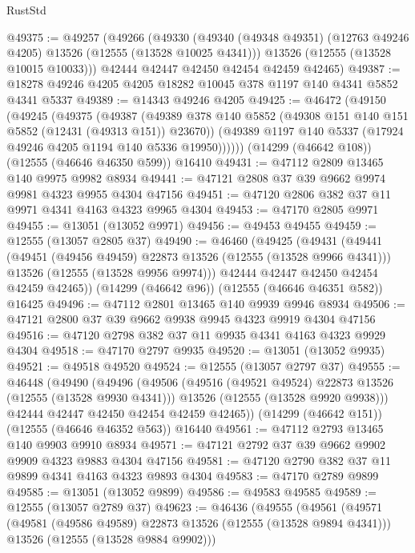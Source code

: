 \begin{lexlean}{RustStd}
\begin{coremodule}
@49375 := @49257
    (@49266
      (@49330
        (@49340 (@49348 @49351) (@12763 @49246 @4205) @13526 (@12555 (@13528 @10025 @4341)))
        @13526
        (@12555 (@13528 @10015 @10033)))
      @42444
      @42447
      @42450
      @42454
      @42459
      @42465)
@49387 := @18278 @49246 @4205 @4205 @18282 @10045 @378 @1197 @140 @4341 @5852 @4341 @5337
@49389 := @14343 @49246 @4205
@49425 := @46472
    (@49150
      (@49245
        (@49375
          (@49387
            (@49389 @378 @140 @5852 (@49308 @151 @140 @151 @5852 (@12431 (@49313 @151)) @23670))
            (@49389 @1197 @140 @5337 (@17924 @49246 @4205 @1194 @140 @5336 @19950))))))
    (@14299 (@46642 @108))
    (@12555 (@46646 @46350 @599))
    @16410
@49431 := @47112 @2809 @13465 @140 @9975 @9982 @8934
@49441 := @47121 @2808 @37 @39 @9662 @9974 @9981 @4323 @9955 @4304 @47156
@49451 := @47120 @2806 @382 @37 @11 @9971 @4341 @4163 @4323 @9965 @4304
@49453 := @47170 @2805 @9971
@49455 := @13051 (@13052 @9971)
@49456 := @49453 @49455
@49459 := @12555 (@13057 @2805 @37)
@49490 := @46460
    (@49425
      (@49431
        (@49441
          (@49451 (@49456 @49459) @22873 @13526 (@12555 (@13528 @9966 @4341)))
          @13526
          (@12555 (@13528 @9956 @9974)))
        @42444
        @42447
        @42450
        @42454
        @42459
        @42465))
    (@14299 (@46642 @96))
    (@12555 (@46646 @46351 @582))
    @16425
@49496 := @47112 @2801 @13465 @140 @9939 @9946 @8934
@49506 := @47121 @2800 @37 @39 @9662 @9938 @9945 @4323 @9919 @4304 @47156
@49516 := @47120 @2798 @382 @37 @11 @9935 @4341 @4163 @4323 @9929 @4304
@49518 := @47170 @2797 @9935
@49520 := @13051 (@13052 @9935)
@49521 := @49518 @49520
@49524 := @12555 (@13057 @2797 @37)
@49555 := @46448
    (@49490
      (@49496
        (@49506
          (@49516 (@49521 @49524) @22873 @13526 (@12555 (@13528 @9930 @4341)))
          @13526
          (@12555 (@13528 @9920 @9938)))
        @42444
        @42447
        @42450
        @42454
        @42459
        @42465))
    (@14299 (@46642 @151))
    (@12555 (@46646 @46352 @563))
    @16440
@49561 := @47112 @2793 @13465 @140 @9903 @9910 @8934
@49571 := @47121 @2792 @37 @39 @9662 @9902 @9909 @4323 @9883 @4304 @47156
@49581 := @47120 @2790 @382 @37 @11 @9899 @4341 @4163 @4323 @9893 @4304
@49583 := @47170 @2789 @9899
@49585 := @13051 (@13052 @9899)
@49586 := @49583 @49585
@49589 := @12555 (@13057 @2789 @37)
@49623 := @46436
    (@49555
      (@49561
        (@49571
          (@49581 (@49586 @49589) @22873 @13526 (@12555 (@13528 @9894 @4341)))
          @13526
          (@12555 (@13528 @9884 @9902)))

\end{coremodule}
\end{lexlean}
